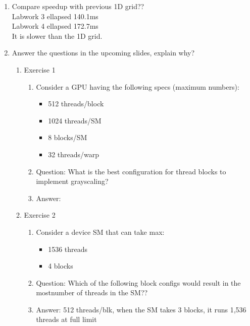 \documentclass{article}
\begin{document}
\begin{enumerate}
    \item Compare speedup with previous 1D grid??\\
    Labwork 3 ellapsed 140.1ms\\
    Labwork 4 ellapsed 172.7ms\\
    It is slower than the 1D grid.

    \item Answer the questions in the upcoming slides, explain why?
    \begin{enumerate}
        \item Exercise 1
        \begin{enumerate}
            \item Consider a GPU having the following specs (maximum numbers):
            \begin{itemize}
                \item 512 threads/block
                \item 1024 threads/SM
                \item 8 blocks/SM
                \item 32 threads/warp
            \end{itemize}
            
            \item Question: What is the best configuration for thread blocks to implement grayscaling?
            \item Answer: 
        \end{enumerate}
        
        \item Exercise 2
        \begin{enumerate}
            \item Consider a device SM that can take max:
            \begin{itemize}
                \item 1536 threads
                \item 4 blocks
            \end{itemize}
            \item Question: Which of the following block configs would result in the mostnumber of threads in the SM??
            \item Answer: 512 threads/blk, when the SM takes 3 blocks, it runs 1,536 threads at full limit
        \end{enumerate}
        

\end{enumerate}
\end{enumerate}
\end{document}
